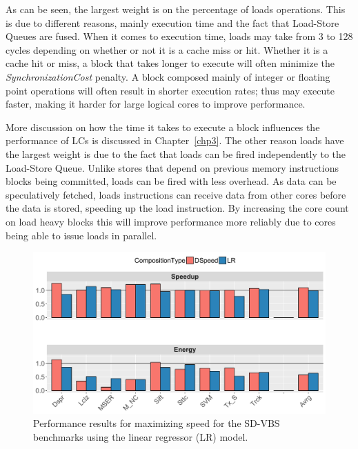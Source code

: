 As can be seen, the largest weight is on the percentage of loads operations.
This is due to different reasons, mainly execution time and the fact that Load-Store Queues are fused.
When it comes to execution time, loads may take from 3 to 128 cycles depending on whether or not it is a cache miss or hit.
Whether it is a cache hit or miss, a block that takes longer to execute will often minimize the \textit{SynchronizationCost} penalty.
A block composed mainly of integer or floating point operations will often result in shorter execution rates; thus may execute faster, making it harder for large logical cores to improve performance.

More discussion on how the time it takes to execute a block influences the performance of LCs is discussed in Chapter~\ref{chp3}.
The other reason loads have the largest weight is due to the fact that loads can be fired independently to the Load-Store Queue.
Unlike stores that depend on previous memory instructions blocks being committed, loads can be fired with less overhead.
As data can be speculatively fetched, loads instructions can receive data from other cores before the data is stored, speeding up the load instruction.
By increasing the core count on load heavy blocks this will improve performance more reliably due to cores being able to issue loads in parallel.

\begin{figure}[t]
    \centering
	\includegraphics[width=1\textwidth]{cases-paper/graphics/results/lr_speed3.pdf}
    \caption{Performance results for maximizing speed for the SD-VBS benchmarks using the linear regressor (LR) model.}%
    \label{fig:speedlr}
	\vspace{1em}
\end{figure}

